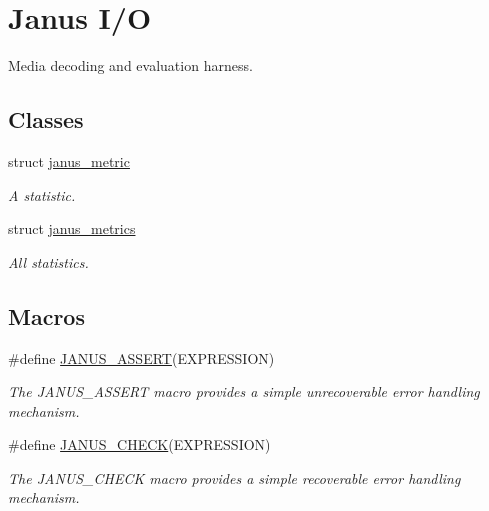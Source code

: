 \hypertarget{group__janus__io}{}\section{Janus I/\+O}
\label{group__janus__io}


Media decoding and evaluation harness.  


\subsection*{Classes}
\begin{DoxyCompactItemize}
\item 
struct \hyperlink{structjanus__metric}{janus\+\_\+metric}
\begin{DoxyCompactList}\small\item\em A statistic. \end{DoxyCompactList}\item 
struct \hyperlink{structjanus__metrics}{janus\+\_\+metrics}
\begin{DoxyCompactList}\small\item\em All statistics. \end{DoxyCompactList}\end{DoxyCompactItemize}
\subsection*{Macros}
\begin{DoxyCompactItemize}
\item 
\#define \hyperlink{group__janus__io_ga7e53a79216ca8af059cd79a46a3de6dc}{J\+A\+N\+U\+S\+\_\+\+A\+S\+S\+E\+R\+T}(E\+X\+P\+R\+E\+S\+S\+I\+O\+N)                                                                      
\begin{DoxyCompactList}\small\item\em The {\ttfamily J\+A\+N\+U\+S\+\_\+\+A\+S\+S\+E\+R\+T} macro provides a simple unrecoverable error handling mechanism. \end{DoxyCompactList}\item 
\#define \hyperlink{group__janus__io_ga5e4ad61a35886261a277785553a2c587}{J\+A\+N\+U\+S\+\_\+\+C\+H\+E\+C\+K}(E\+X\+P\+R\+E\+S\+S\+I\+O\+N)                      
\begin{DoxyCompactList}\small\item\em The {\ttfamily J\+A\+N\+U\+S\+\_\+\+C\+H\+E\+C\+K} macro provides a simple recoverable error handling mechanism. \end{DoxyCompactList}\end{DoxyCompactItemize}
